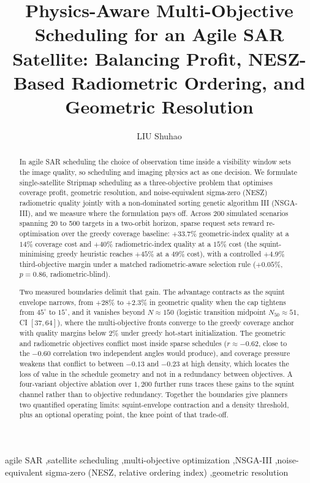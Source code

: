 \documentclass[preprint,12pt,authoryear]{elsarticle}
\begin{document}
\begin{frontmatter}
\title{Physics-Aware Multi-Objective Scheduling for an Agile SAR Satellite: Balancing Profit, NESZ-Based Radiometric Ordering, and Geometric Resolution}
\author{LIU Shuhao}
\begin{abstract}
In agile SAR scheduling the choice of observation time inside a visibility
window sets the image quality, so scheduling and imaging physics act as one
decision. We formulate single-satellite Stripmap scheduling as a
three-objective problem that optimises coverage profit, geometric resolution,
and noise-equivalent sigma-zero (NESZ) radiometric quality jointly with a
non-dominated sorting genetic algorithm III (NSGA-III), and we measure where
the formulation pays off. Across 200 simulated scenarios spanning 20 to 500
targets in a two-orbit horizon, sparse request sets reward re-optimisation
over the greedy coverage baseline:
$+33.7\%$
geometric-index quality at a $14\%$ coverage cost and $+40\%$ radiometric-index
quality at a $15\%$ cost (the squint-minimising greedy heuristic reaches
$+45\%$ at a $49\%$ cost), with a controlled $+4.9\%$ third-objective margin
under a matched radiometric-aware selection rule ($+0.05\%$, $p=0.86$,
radiometric-blind).

Two measured boundaries delimit
that gain. The advantage contracts as the squint envelope narrows, from $+28\%$
to $+2.3\%$ in geometric quality when the cap tightens from $45^\circ$ to
$15^\circ$, and it vanishes beyond $N \approx 150$ (logistic transition
midpoint $N_{50} \approx 51$, CI $[37, 64]$), where the
multi-objective fronts converge to the greedy coverage anchor with quality
margins below $2\%$ under greedy hot-start initialization. The geometric and
radiometric objectives conflict most inside sparse schedules
($r \approx -0.62$, close to the $-0.60$ correlation two independent angles
would produce), and
coverage pressure weakens that conflict to between $-0.13$ and $-0.23$ at
high density,
which locates the loss of value in the schedule geometry and not in a
redundancy between objectives. A four-variant objective ablation over
$1{,}200$ further runs traces these gains to the squint channel rather than
to objective redundancy. Together the boundaries give planners two quantified operating limits:
squint-envelope contraction and a density threshold, plus an optional
operating point, the knee point of that trade-off.
\end{abstract}
\begin{keyword}
agile SAR \sep satellite scheduling \sep multi-objective optimization \sep NSGA-III \sep noise-equivalent sigma-zero (NESZ, relative ordering index) \sep geometric resolution
\end{keyword}
\end{frontmatter}
\end{document}
